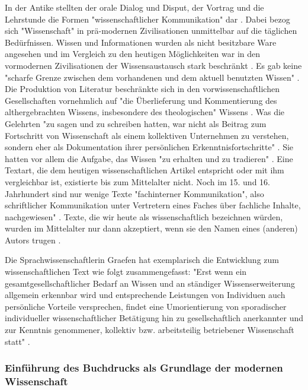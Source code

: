 In der Antike stellten der orale Dialog und Disput, der Vortrag und die Lehrstunde die Formen "wissenschaftlicher Kommunikation" dar \cite{hollricher_wandel_2009}. Dabei bezog sich "Wissenschaft" in prä-modernen Zivilisationen unmittelbar auf die täglichen Bedürfnissen. Wissen und Informationen wurden als nicht besitzbare Ware angesehen \cite{cite:18} \cite{steiner_1998_autorenhonorar} und im Vergleich zu den heutigen Möglichkeiten war in den vormodernen Zivilisationen der Wissensaustausch stark beschränkt \cite{cite:17c}. Es gab keine "scharfe Grenze zwischen dem vorhandenen und dem aktuell benutzten Wissen" \cite{Luhmann1998}. Die Produktion von Literatur beschränkte sich in den vorwissenschaftlichen Gesellschaften vornehmlich auf "die Überlieferung und Kommentierung des althergebrachten Wissens, insbesondere des theologischen" Wissens \cite{steiner_1998_autorenhonorar}. Was die Gelehrten "zu sagen und zu schreiben hatten, war nicht als Beitrag zum Fortschritt von Wissenschaft als einem kollektiven Unternehmen zu verstehen, sondern eher als Dokumentation ihrer persönlichen Erkenntnisfortschritte" \cite{graefen2007_wissenschaftliche_artikel}. Sie hatten vor allem die Aufgabe, das Wissen "zu erhalten und zu tradieren" \cite{Luhmann1998}. Eine Textart, die dem heutigen wissenschaftlichen Artikel entspricht oder mit ihm vergleichbar ist, existierte bis zum Mittelalter nicht. Noch im 15. und 16. Jahrhundert sind nur wenige Texte "fachinterner Kommunikation", also schriftlicher Kommunikation unter Vertretern eines Faches über fachliche Inhalte, nachgewiesen" \cite{graefen2007_wissenschaftliche_artikel}. Texte, die wir heute als wissenschaftlich bezeichnen würden, wurden im Mittelalter nur dann akzeptiert, wenn sie den Namen eines (anderen) Autors trugen \cite{foucault_2000_autor}.

Die Sprachwissenschaftlerin Graefen hat exemplarisch die Entwicklung zum wissenschaftlichen Text wie folgt zusammengefasst: "Erst wenn ein gesamtgesellschaftlicher Bedarf an Wissen und an ständiger Wissenserweiterung allgemein erkennbar wird und entsprechende Leistungen von Individuen auch persönliche Vorteile versprechen, findet eine Umorientierung von sporadischer individueller wissenschaftlicher Betätigung hin zu gesellschaftlich anerkannter und zur Kenntnis genommener, kollektiv bzw. arbeitsteilig betriebener Wissenschaft statt" \cite{graefen2007_wissenschaftliche_artikel}.

\subsubsection{Einführung des Buchdrucks als Grundlage der modernen Wissenschaft}

